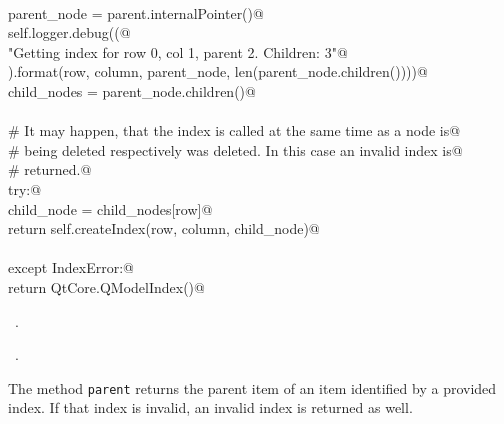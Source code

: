 \documentclass[
    a4paper,      %
    10pt,         %
    openright,    %
    notitlepage,  %
    parskip=half, %
]{scrreprt}       %
\theoremstyle{definition}                    %
\begin{document}
\begin{flushleft}
\begin{minipage}{\linewidth}
\begin{list}{}{}
\mbox{}\lstinline@@\\
\mbox{}\lstinline@    parent_node = parent.internalPointer()@\\
\mbox{}\lstinline@    self.logger.debug((@\\
\mbox{}\lstinline@        "Getting index for row {0}, col {1}, parent {2}. Children: {3}"@\\
\mbox{}\lstinline@    ).format(row, column, parent_node, len(parent_node.children())))@\\
\mbox{}\lstinline@    child_nodes = parent_node.children()@\\
\mbox{}\lstinline@@\\
\mbox{}\lstinline@    # It may happen, that the index is called at the same time as a node is@\\
\mbox{}\lstinline@    # being deleted respectively was deleted. In this case an invalid index is@\\
\mbox{}\lstinline@    # returned.@\\
\mbox{}\lstinline@    try:@\\
\mbox{}\lstinline@        child_node  = child_nodes[row]@\\
\mbox{}\lstinline@        return self.createIndex(row, column, child_node)@\\
\mbox{}\lstinline@@\\
\mbox{}\lstinline@    except IndexError:@\\
\mbox{}\lstinline@        return QtCore.QModelIndex()@{\NWsep}
\end{list}
\vspace{-1.5ex}
\footnotesize
\begin{list}{}{\setlength{\itemsep}{-\parsep}\setlength{\itemindent}{-\leftmargin}}
\item \NWtxtMacroDefBy\ .
\item \NWtxtMacroRefIn\ .

\item{}
\end{list}
\end{minipage}\vspace{4ex}
\end{flushleft}
The method \verb+parent+ returns the parent item of an item identified by a
provided index. If that index is invalid, an invalid index is returned as well.
\end{document}
